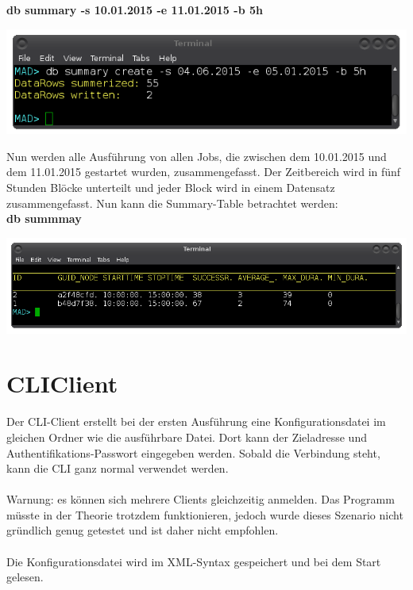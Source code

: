 \documentclass[12pt,a4paper]{report}
\begin{document}
\textbf{db summary -s 10.01.2015 -e 11.01.2015 -b 5h}

\begin{center}
\includegraphics[scale=0.5]{img/db_summary_create.png}
\end{center}

Nun werden alle Ausführung von allen Jobs, die zwischen dem 10.01.2015 und dem 11.01.2015 gestartet wurden, zusammengefasst. Der Zeitbereich wird in fünf Stunden Blöcke unterteilt und jeder Block wird in einem Datensatz zusammengefasst. Nun kann die Summary-Table betrachtet werden:\\

\textbf{db summmay}

\begin{center}
\includegraphics[scale=0.5]{img/db_summary.png}
\end{center}

\chapter{CLIClient}

Der CLI-Client erstellt bei der ersten Ausführung eine Konfigurationsdatei im gleichen Ordner wie die ausführbare Datei. Dort kann der Zieladresse und Authentifikations-Passwort eingegeben werden. Sobald die Verbindung steht, kann die CLI ganz normal verwendet werden.\\\\
Warnung: es können sich mehrere Clients gleichzeitig anmelden. Das Programm müsste in der Theorie trotzdem funktionieren, jedoch wurde dieses Szenario nicht gründlich genug getestet und ist daher nicht empfohlen.\\\\

Die Konfigurationsdatei wird im XML-Syntax gespeichert und bei dem Start gelesen.
\end{document}
